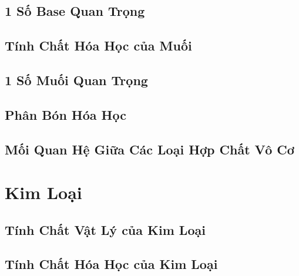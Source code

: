 \documentclass{article}
\numberwithin{equation}{section}
\begin{document}
\subsection{1 Số Base Quan Trọng}


\subsection{Tính Chất Hóa Học của Muối}


\subsection{1 Số Muối Quan Trọng}


\subsection{Phân Bón Hóa Học}


\subsection{Mối Quan Hệ Giữa Các Loại Hợp Chất Vô Cơ}


\section{Kim Loại}

\subsection{Tính Chất Vật Lý của Kim Loại}


\subsection{Tính Chất Hóa Học của Kim Loại}
\end{document}
